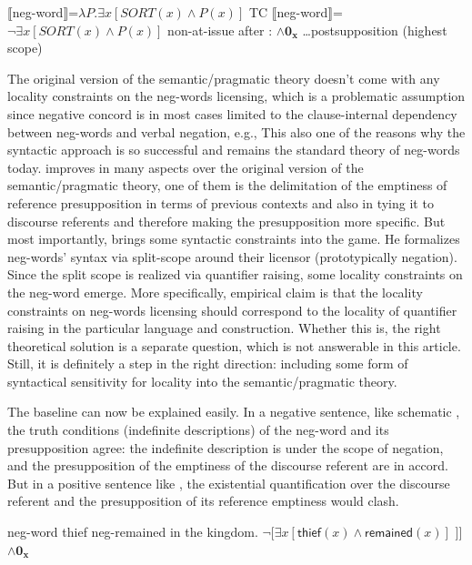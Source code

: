 \ea\label{ex-13} \ea\label{ex-13-a} \(\llbracket\)neg-word\(\rrbracket\)=\(\lambda P.\exists x[SORT(x) \wedge P(x)]\)
  \hfill TC 
\ex\label{ex-13-b}   \(\llbracket\)neg-word\(\rrbracket\)=\(\neg \exists x[SORT(x) \wedge P(x)]\)
  \hfill non-at-issue 
\ex\label{ex-13-c} after \textcite{kuhn2022dynamics}:
  \(\wedge \mathbf{0_x}\) \ldots postsupposition (highest scope) \z\z
  
The original version of the semantic/pragmatic theory doesn't come with any locality constraints on the neg-words licensing, which is a problematic assumption since negative concord is in most cases limited to the clause-internal dependency between neg-words and verbal negation, e.g., This also one of the reasons why the syntactic approach is so successful and remains the standard theory of neg-words today. \citet{kuhn2022dynamics} improves in many aspects over the original version of the semantic/pragmatic theory, one of them is the delimitation of the emptiness of reference presupposition in terms of previous contexts and also in tying it to discourse referents and therefore making the presupposition more specific. But most importantly, \citet{kuhn2022dynamics} brings some syntactic constraints into the game. He formalizes neg-words' syntax via split-scope around their licensor (prototypically negation). Since the split scope is realized via quantifier raising, some locality constraints on the neg-word emerge. More specifically,  empirical claim is that the locality constraints on neg-words licensing should correspond to the locality of quantifier raising in the particular language and construction. Whether this is, the right theoretical solution is a separate question, which is not answerable in this article. Still, it is definitely a step in the right direction: including some form of syntactical sensitivity for locality into the semantic/pragmatic theory.

The baseline can now be explained easily. In a negative sentence, like schematic , the truth conditions (indefinite descriptions) of the neg-word and its presupposition agree: the indefinite description is under the scope of negation, and the presupposition of the emptiness of the discourse referent are in accord. But in a positive sentence like , the existential quantification over the discourse referent and the presupposition of its reference emptiness would clash. 


\ea\label{ex-14} neg-word thief neg-remained in the kingdom. \ea {[}\(\neg[\exists x[\mathsf{thief}(x) \wedge \mathsf{remained}(x)]\) {]}{]} \(\wedge \mathbf{0_x}\)\z\z

